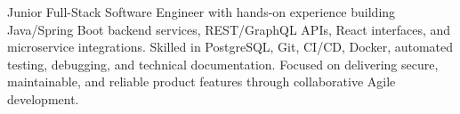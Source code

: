 \par{
Junior Full-Stack Software Engineer with hands-on experience building Java/Spring Boot backend services, REST/GraphQL APIs, React interfaces, and microservice integrations. Skilled in PostgreSQL, Git, CI/CD, Docker, automated testing, debugging, and technical documentation. Focused on delivering secure, maintainable, and reliable product features through collaborative Agile development.
}
